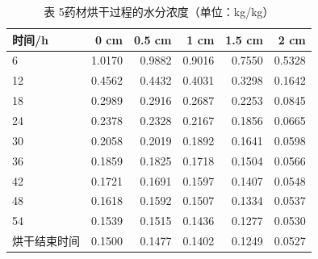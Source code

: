 \begin{table}[H]
\centering
\caption{表 5\quad 药材烘干过程的水分浓度（单位：kg/kg）}
\label{tab:p3C}
\footnotesize
\begin{tabular}{@{}lrrrrr@{}}
\toprule
时间/h & 0 cm & 0.5 cm & 1 cm & 1.5 cm & 2 cm \\
\midrule
6 & 1.0170 & 0.9882 & 0.9016 & 0.7550 & 0.5328 \\
12 & 0.4562 & 0.4432 & 0.4031 & 0.3298 & 0.1642 \\
18 & 0.2989 & 0.2916 & 0.2687 & 0.2253 & 0.0845 \\
24 & 0.2378 & 0.2328 & 0.2167 & 0.1856 & 0.0665 \\
30 & 0.2058 & 0.2019 & 0.1892 & 0.1641 & 0.0598 \\
36 & 0.1859 & 0.1825 & 0.1718 & 0.1504 & 0.0566 \\
42 & 0.1721 & 0.1691 & 0.1597 & 0.1407 & 0.0548 \\
48 & 0.1618 & 0.1592 & 0.1507 & 0.1334 & 0.0537 \\
54 & 0.1539 & 0.1515 & 0.1436 & 0.1277 & 0.0530 \\
烘干结束时间 & 0.1500 & 0.1477 & 0.1402 & 0.1249 & 0.0527 \\
\bottomrule
\end{tabular}
\end{table}
